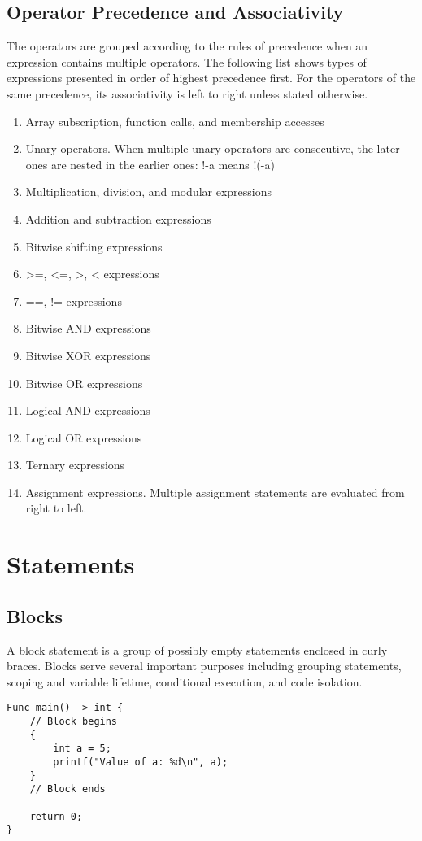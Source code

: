 \documentclass[11pt,A4]{article}
\begin{document}
        \subsection{Operator Precedence and Associativity}
        The operators are grouped according to the rules of precedence when an expression contains multiple operators. The following list shows types of expressions presented in order of highest precedence first. For the operators of the same precedence, its associativity is left to right unless stated otherwise.
        \begin{enumerate}
            \item Array subscription, function calls, and membership accesses
            \item Unary operators. When multiple unary operators are consecutive, the later ones are nested in the earlier ones: !-a means !(-a)
            \item Multiplication, division, and modular expressions
            \item Addition and subtraction expressions
            \item Bitwise shifting expressions
            \item >=, <=, >, < expressions
            \item ==, != expressions
            \item Bitwise AND expressions
            \item Bitwise XOR expressions
            \item Bitwise OR expressions
            \item Logical AND expressions
            \item Logical OR expressions
            \item Ternary expressions
            \item Assignment expressions. Multiple assignment statements are evaluated from right to left. 
        \end{enumerate}

    \newpage
    \section{Statements}
        \subsection{Blocks}
        A block statement is a group of possibly empty statements enclosed in curly braces. Blocks serve several important purposes including grouping statements, scoping and variable lifetime, conditional execution, and code isolation.
        \begin{lstlisting}
Func main() -> int {
    // Block begins
    {
        int a = 5;
        printf("Value of a: %d\n", a);
    }
    // Block ends

    return 0;
}
        \end{lstlisting}
        
\end{document}
